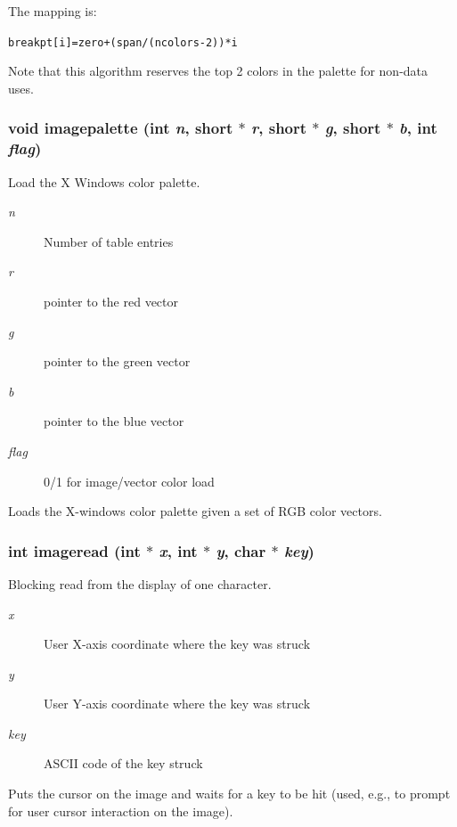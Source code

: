 The mapping is: \small\begin{alltt}
  breakpt[i] = zero + (span/(ncolors-2)) * i
  \end{alltt}\normalsize 
 Note that this algorithm reserves the top 2 colors in the palette for non-data uses. 
\subsubsection{\setlength{\rightskip}{0pt plus 5cm}void imagepalette (int {\em n}, short $\ast$ {\em r}, short $\ast$ {\em g}, short $\ast$ {\em b}, int {\em flag})}\label{xtvutils_8c_a172}


Load the X Windows color palette. 

\begin{Desc}
\item[Parameters:]
\begin{description}
\item[{\em n}]Number of table entries \item[{\em r}]pointer to the red vector \item[{\em g}]pointer to the green vector \item[{\em b}]pointer to the blue vector \item[{\em flag}]0/1 for image/vector color load\end{description}
\end{Desc}
Loads the X-windows color palette given a set of RGB color vectors. 
\subsubsection{\setlength{\rightskip}{0pt plus 5cm}int imageread (int $\ast$ {\em x}, int $\ast$ {\em y}, char $\ast$ {\em key})}\label{xtvutils_8c_a188}


Blocking read from the display of one character. 

\begin{Desc}
\item[Parameters:]
\begin{description}
\item[{\em x}]User X-axis coordinate where the key was struck \item[{\em y}]User Y-axis coordinate where the key was struck \item[{\em key}]ASCII code of the key struck\end{description}
\end{Desc}
Puts the cursor on the image and waits for a key to be hit (used, e.g., to prompt for user cursor interaction on the image).


